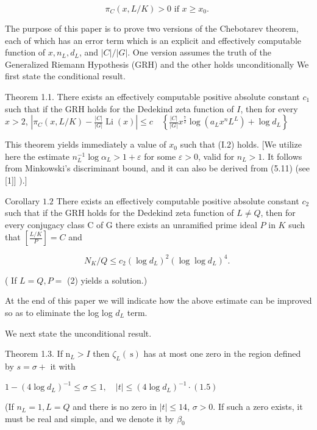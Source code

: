 $$
\pi_{C}(x, L / K)>0 \text { if } x \geq x_{0} \text {. }
$$

The purpose of this paper is to prove two versions of the Chebotarev theorem, each of which has an error term which is an explicit and effectively computable function of $x, n_{L}, d_{L}$, and $|C| /|G|$. One version assumes the truth of the Generalized Riemann Hypothesis (GRH) and the other holds unconditionally We first state the conditional result.

Theorem 1.1. There exists an effectively computable positive absolute constant $c_{1}$ such that if the GRH holds for the Dedekind zeta function of $I$, then for every $x>2$, $\left|\pi_{C}(x, L / K)-\frac{|C|}{|G|} \operatorname{Li}(x)\right| \leqslant c \quad\left\{\frac{|C|}{|G|} x^{\frac{7}{2}} \log \left(a_{L} x^{n} L^{L}\right)+\log d_{L}\right\}$

This theorem yields immediately a value of $x_{0}$ such that (I.2) holds. [We utilize here the estimate $n_{L}^{-1} \log \alpha_{L}>1+\varepsilon$ for some $\varepsilon>0$, valid for $n_{L}>1$. It follows from Minkowski's discriminant bound, and it can also be derived from (5.11) (see [1]] ).]

Corollary $1.2$ There exists an effectively computable positive absolute constant $c_{2}$ such that if the GRH holds for the Dedekind zeta function of $L \neq Q$, then for every conjugacy class $\mathrm{C}$ of $\mathrm{G}$ there exists an unramified prime ideal $P$ in $K$ such that $\left[\frac{L / K}{P}\right]=C$ and

$$
N_{K} / Q \leqslant c_{2}\left(\log d_{L}\right)^{2}\left(\log \log d_{L}\right)^{4} \text {. }
$$

( If $L=Q, P=$ (2) yields a solution.)

At the end of this paper we will indicate how the above estimate can be improved so as to eliminate the log log $d_{L}$ term.

We next state the unconditional result.

Theorem 1.3. If $\mathrm{n}_{L}>I$ then $\zeta_{L}(\mathrm{~s})$ has at most one zero in the region defined by $s=\sigma+$ it with

$1-\left(4 \log d_{L}\right)^{-1} \leqslant \sigma \leqslant 1, \quad|t| \leqslant\left(4 \log d_{L}\right)^{-1} \cdot(1.5)$

(If $n_{L}=1, L=Q$ and there is no zero in $|t| \leqslant 14$, $\sigma>0$. If such a zero exists, it must be real and simple, and we denote it by $\beta_{0}$

